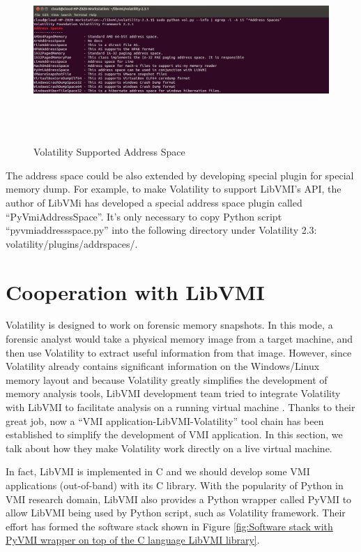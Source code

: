 \begin{figure}[htbp]
	\centering
		\includegraphics[width=14cm, height= 7cm ]{Figures/Figure28.png}
	\caption[Volatility Supported Address Space]{Volatility Supported Address Space}
	\label{fig:Volatility Supported Address Space}
\end{figure}

The address space could be also extended by developing special plugin for special memory dump. 
For example, to make Volatility to support LibVMI’s API, the author of LibVMi has developed a special address space plugin called 
“PyVmiAddressSpace”. It’s only necessary to copy Python script “pyvmiaddressspace.py” into the following directory under 
Volatility 2.3: volatility/plugins/addrspaces/.

\section{Cooperation with LibVMI}
Volatility is designed to work on forensic memory snapshots. In this mode, a forensic analyst would take a physical memory image from
a target machine, and then use Volatility to extract useful information from that image. However, since Volatility already contains 
significant information on the Windows/Linux memory layout and because Volatility greatly simplifies the development of memory analysis 
tools, LibVMI development team tried to integrate Volatility with LibVMI to facilitate analysis on a running virtual machine \cite{Reference8}. Thanks
to their great job, now a “VMI application-LibVMI-Volatility” tool chain has been established to simplify the development of VMI application.
In this section, we talk about how they make Volatility work directly on a live virtual machine.

In fact, LibVMI is implemented in C and we should develop some VMI applications (out-of-band) with its C library. With the popularity of 
Python in VMI research domain, LibVMI also provides a Python wrapper called PyVMI to allow LibVMI being used by Python script, such as 
Volatility framework. Their effort has formed the software stack shown in Figure \ref{fig:Software stack with PyVMI wrapper on top of the C language LibVMI library}.

